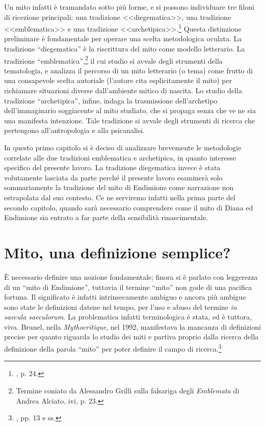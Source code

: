 \documentclass[12pt,a4paper,openright, oneside]{book}
\begin{document}
Un mito infatti è tramandato sotto più forme, e si possono individuare tre filoni di ricezione principali: una tradizione <<diegematica>>, una tradizione <<emblematica>> e una tradizione <<archetipica>>.\footnote{\cite{Grilli}, p. 24.} Questa distinzione preliminare è fondamentale per operare una scelta metodologica oculata.
La tradizione ``diegematica'' è la riscrittura del mito come modello letterario.
 La tradizione ``emblematica'',\footnote{Termine coniato da Alessandro Grilli sulla falsariga degli \textit{Emblemata} di Andrea Alciato, ivi, p. 23.} il cui studio si avvale degli strumenti della tematologia, e analizza il percorso di un mito letterario (o tema) come frutto di una consapevole scelta autoriale (l'autore cita esplicitamente il mito) per richiamare situazioni diverse dall'ambiente mitico di nascita. 
 Lo studio della tradizione ``archetipica'', infine, indaga la trasmissione dell'archetipo dell'immaginario soggiacente al mito studiato, che si propaga senza che ve ne sia una manifesta intenzione. Tale tradizione si avvale degli strumenti di ricerca che pertengono all'antropologia e alla psicanalisi.
 
In questo primo capitolo si è deciso di analizzare brevemente le metodologie correlate alle due tradizioni emblematica e archetipica, in quanto interesse specifico del presente lavoro. La tradizione diegematica invece è stata volutamente lasciata da parte perché il presente lavoro esaminerà solo sommariamente la tradizione del mito di Endimione come narrazione non estrapolata dal suo contesto. Ce ne serviremo infatti nella prima parte del secondo capitolo, quando sarà necessario comprendere come il mito di Diana ed Endimione sia entrato a far parte della sensibilità rinascimentale.

\section{Mito, una definizione semplice?}

È necessario definire una nozione fondamentale; finora si è parlato con leggerezza di un ``mito di Endimione'', tuttavia il termine ``mito'' non gode di una pacifica fortuna. Il significato è infatti intrinsecamente ambiguo e ancora più ambigue sono state le definizioni datene nel tempo, per l'uso e abuso del termine \textit{in saecula saeculorum}. La problematica infatti terminologica è stata, ed è tuttora, viva. Brunel, nella \textit{Mythocritique}, nel 1992, manifestava la mancanza di definizioni precise per quanto riguarda lo studio dei miti e partiva proprio dalla ricerca della definizione della parola ``mito'' per poter definire il campo di ricerca.\footnote{\cite{Brunel1}, pp. 13 e ss.}
\end{document}
